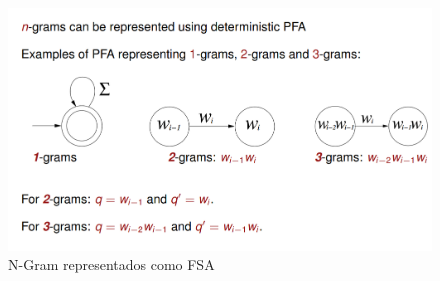 \begin{figure}[htbp]
   \centering
   \includegraphics{images/07/ngramFSA.png}
   \caption{N-Gram representados como FSA}
   \label{fig:07/ngramFSA}
\end{figure}



